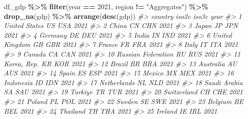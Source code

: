 \documentclass[
  xelatex, ja=standard]{bxjsbook}
\newenvironment{Shaded}{\begin{snugshade}}{\end{snugshade}}
\newcommand{\CommentTok}[1]{\textcolor[rgb]{0.56,0.35,0.01}{\textit{#1}}}
\newcommand{\DecValTok}[1]{\textcolor[rgb]{0.00,0.00,0.81}{#1}}
\newcommand{\FunctionTok}[1]{\textcolor[rgb]{0.13,0.29,0.53}{\textbf{#1}}}
\newcommand{\NormalTok}[1]{#1}
\newcommand{\SpecialCharTok}[1]{\textcolor[rgb]{0.81,0.36,0.00}{\textbf{#1}}}
\newcommand{\StringTok}[1]{\textcolor[rgb]{0.31,0.60,0.02}{#1}}
\theoremstyle{definition}
\theoremstyle{definition}
\theoremstyle{definition}
\theoremstyle{definition}
\theoremstyle{remark}
\begin{document}
\begin{Shaded}
\begin{Highlighting}[]
\NormalTok{df\_gdp }\SpecialCharTok{\%\textgreater{}\%} \FunctionTok{filter}\NormalTok{(year }\SpecialCharTok{==} \DecValTok{2021}\NormalTok{, region }\SpecialCharTok{!=} \StringTok{"Aggregates"}\NormalTok{) }\SpecialCharTok{\%\textgreater{}\%} 
  \FunctionTok{drop\_na}\NormalTok{(gdp) }\SpecialCharTok{\%\textgreater{}\%} \FunctionTok{arrange}\NormalTok{(}\FunctionTok{desc}\NormalTok{(gdp))}
\CommentTok{\#\textgreater{}                            country iso2c iso3c year}
\CommentTok{\#\textgreater{} 1                    United States    US   USA 2021}
\CommentTok{\#\textgreater{} 2                            China    CN   CHN 2021}
\CommentTok{\#\textgreater{} 3                            Japan    JP   JPN 2021}
\CommentTok{\#\textgreater{} 4                          Germany    DE   DEU 2021}
\CommentTok{\#\textgreater{} 5                            India    IN   IND 2021}
\CommentTok{\#\textgreater{} 6                   United Kingdom    GB   GBR 2021}
\CommentTok{\#\textgreater{} 7                           France    FR   FRA 2021}
\CommentTok{\#\textgreater{} 8                            Italy    IT   ITA 2021}
\CommentTok{\#\textgreater{} 9                           Canada    CA   CAN 2021}
\CommentTok{\#\textgreater{} 10              Russian Federation    RU   RUS 2021}
\CommentTok{\#\textgreater{} 11                     Korea, Rep.    KR   KOR 2021}
\CommentTok{\#\textgreater{} 12                          Brazil    BR   BRA 2021}
\CommentTok{\#\textgreater{} 13                       Australia    AU   AUS 2021}
\CommentTok{\#\textgreater{} 14                           Spain    ES   ESP 2021}
\CommentTok{\#\textgreater{} 15                          Mexico    MX   MEX 2021}
\CommentTok{\#\textgreater{} 16                       Indonesia    ID   IDN 2021}
\CommentTok{\#\textgreater{} 17                     Netherlands    NL   NLD 2021}
\CommentTok{\#\textgreater{} 18                    Saudi Arabia    SA   SAU 2021}
\CommentTok{\#\textgreater{} 19                         Turkiye    TR   TUR 2021}
\CommentTok{\#\textgreater{} 20                     Switzerland    CH   CHE 2021}
\CommentTok{\#\textgreater{} 21                          Poland    PL   POL 2021}
\CommentTok{\#\textgreater{} 22                          Sweden    SE   SWE 2021}
\CommentTok{\#\textgreater{} 23                         Belgium    BE   BEL 2021}
\CommentTok{\#\textgreater{} 24                        Thailand    TH   THA 2021}
\CommentTok{\#\textgreater{} 25                         Ireland    IE   IRL 2021}

\end{Highlighting}
\end{Shaded}
\end{document}
